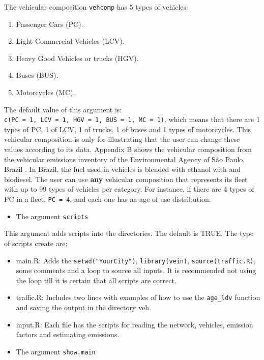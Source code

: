 \documentclass[12pt,graybox,envcountchap,sectrefs]{krantz}
\providecommand{\tightlist}{%
  \setlength{\itemsep}{0pt}\setlength{\parskip}{0pt}}
\theoremstyle{definition}
\theoremstyle{definition}
\theoremstyle{definition}
\theoremstyle{remark}
\begin{document}
The vehicular composition \texttt{vehcomp} has 5 types of vehicles:

\begin{enumerate}
\def\labelenumi{\arabic{enumi}.}
\tightlist
\item
  Passenger Cars (PC).
\item
  Light Commercial Vehicles (LCV).
\item
  Heavy Good Vehicles or trucks (HGV).
\item
  Buses (BUS).
\item
  Motorcycles (MC).
\end{enumerate}

The default value of this argument is:
\texttt{c(PC\ =\ 1,\ LCV\ =\ 1,\ HGV\ =\ 1,\ BUS\ =\ 1,\ MC\ =\ 1)},
which means that there are 1 types of PC, 1 of LCV, 1 of trucks, 1 of
buses and 1 types of motorcycles. This vehicular composition is only for
illustrating that the user can change these values according to its
data. Appendix B shows the vehicular composition from the vehicular
emissions inventory of the Environmental Agency of São Paulo, Brazil
\citep{CETESB2015}. In Brazil, the fuel used in vehicles is blended with
ethanol with and biodiesel. The user can use \textbf{any} vehicular
composition that represents its fleet with up to 99 types of vehicles
per category. For instance, if there are 4 types of PC in a fleet,
\texttt{PC\ =\ 4}, and each one has aa age of use distribution.

\begin{itemize}
\tightlist
\item
  The argument \texttt{scripts}
\end{itemize}

This argument adds scripts into the directories. The default is TRUE.
The type of scripts create are:

\begin{itemize}
\item
  main.R: Adds the \texttt{setwd("YourCity")}, \texttt{library(vein)},
  \texttt{source(traffic.R)}, some comments and a loop to source all
  inputs. It is recommended not using the loop till it is certain that
  all scripts are correct.
\item
  traffic.R: Includes two lines with examples of how to use the
  \texttt{age\_ldv} function and saving the output in the directory veh.
\item
  input.R: Each file has the scripts for reading the network, vehicles,
  emission factors and estimating emissions.
\item
  The argument \texttt{show.main}
\end{itemize}
\end{document}
